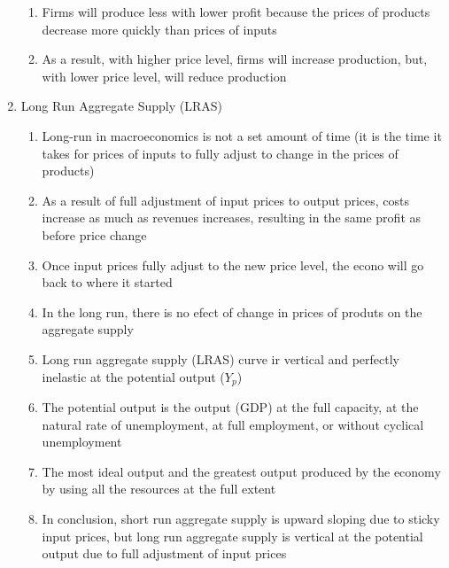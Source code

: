 \documentclass[12pt]{article}
\begin{document}
\begin{enumerate}
\begin{enumerate}
          \item Firms will produce less with lower profit because the prices of products decrease more quickly than prices of inputs

          \item As a result, with higher price level, firms will increase production, but, with lower price level, will reduce production

        \end{enumerate}

      \item Long Run Aggregate Supply (LRAS)

        \begin{enumerate}

          \item Long-run in macroeconomics is not a set amount of time (it is the time it takes for prices of inputs to fully adjust to change in the prices of products)

          \item As a result of full adjustment of input prices to output prices, costs increase as much as revenues increases, resulting in the same profit as before price change

          \item Once input prices fully adjust to the new price level, the econo will go back to where it started

          \item In the long run, there is no efect of change in prices of produts on the aggregate supply

          \item Long run aggregate supply (LRAS) curve ir vertical and perfectly inelastic at the potential output ($Y_p$)

          \item The potential output is the output (GDP) at the full capacity, at the natural rate of unemployment, at full employment, or without cyclical unemployment

          \item The most ideal output and the greatest output produced by the economy by using all the resources at the full extent

          \item In conclusion, short run aggregate supply is upward sloping due to sticky input prices, but long run aggregate supply is vertical at the potential output due to full adjustment of input prices


\end{enumerate}
\end{enumerate}
\end{document}
